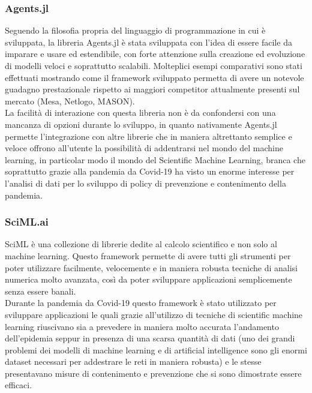 \subsubsection{Agents.jl}
Seguendo la filosofia propria del linguaggio di programmazione in cui è sviluppata, 
la libreria Agents.jl è stata sviluppata con l’idea di essere facile da imparare e usare ed estendibile, 
con forte attenzione sulla creazione ed evoluzione di modelli veloci e soprattutto scalabili. 
Molteplici esempi comparativi sono stati effettuati mostrando come il framework sviluppato permetta 
di avere un notevole guadagno prestazionale rispetto ai maggiori competitor attualmente presenti 
sul mercato (Mesa, Netlogo, MASON). 
\\

La facilità di interazione con questa libreria non è da confondersi con una mancanza 
di opzioni durante lo sviluppo, in quanto nativamente Agents.jl permette l’integrazione con 
altre librerie che in maniera altrettanto semplice e veloce offrono all’utente la possibilità 
di addentrarsi nel mondo del machine learning, in particolar modo il mondo del Scientific Machine Learning, 
branca che soprattutto grazie alla pandemia da Covid-19 ha visto un enorme interesse per l’analisi di dati 
per lo sviluppo di policy di prevenzione e contenimento della pandemia. 

\subsubsection{SciML.ai}
SciML è una collezione di librerie dedite al calcolo scientifico e non solo al machine learning. 
Questo framework permette di avere tutti gli strumenti per poter utilizzare facilmente, 
velocemente e in maniera robusta tecniche di analisi numerica molto avanzata, così da poter 
sviluppare applicazioni semplicemente senza essere banali. 
\\

Durante la pandemia da Covid-19 questo framework è stato utilizzato per sviluppare applicazioni 
le quali grazie all’utilizzo di tecniche di scientific machine learning riuscivano sia a 
prevedere in maniera molto accurata l’andamento dell’epidemia seppur in presenza di una 
scarsa quantità di dati (uno dei grandi problemi dei modelli di machine learning e di artificial 
intelligence sono gli enormi dataset necessari per addestrare le reti in maniera robusta) e 
le stesse presentavano misure di contenimento e prevenzione che si sono dimostrate essere efficaci. 
\\

